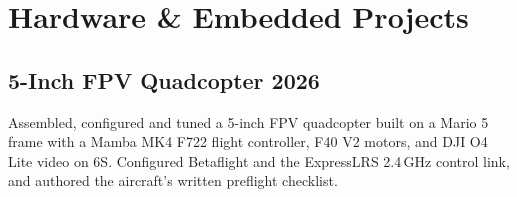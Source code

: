 \documentclass[10pt,a4paper]{article}
\begin{document}

\section*{Hardware \& Embedded Projects}

\subsection*{5-Inch FPV Quadcopter \hfill 2026}
Assembled, configured and tuned a 5-inch FPV quadcopter built on a Mario 5 frame
with a Mamba MK4 F722 flight controller, F40 V2 motors, and DJI O4 Lite video on
6S. Configured Betaflight and the ExpressLRS 2.4\,GHz control link, and authored
the aircraft's written preflight checklist.
\end{document}

